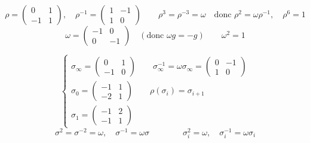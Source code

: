 \documentclass[11pt,a4paper]{article}
\begin{document}
\[
\boxed{\rho = \begin{pmatrix} 0 & 1 \\ -1 & 1 \end{pmatrix}}, \quad
\rho^{-1} = \begin{pmatrix} 1 & -1 \\ 1 & 0 \end{pmatrix}
\qquad \rho^3 = \rho^{-3} = \omega \quad \text{donc } \rho^2 = \omega\rho^{-1}, \quad \rho^6 = 1
\]
\[
\omega = \begin{pmatrix} -1 & 0 \\ 0 & -1 \end{pmatrix} \quad (\text{donc } \omega g = -g) \qquad \omega^2 = 1
\]

\[
\begin{cases}
\boxed{\sigma_\infty = \begin{pmatrix} 0 & 1 \\ -1 & 0 \end{pmatrix}} \qquad
\sigma_\infty^{-1} = \omega\sigma_\infty = \begin{pmatrix} 0 & -1 \\ 1 & 0 \end{pmatrix} \\[4pt]
\sigma_0 = \begin{pmatrix} -1 & 1 \\ -2 & 1 \end{pmatrix} \qquad \rho(\sigma_i) = \sigma_{i+1} \\[4pt]
\sigma_1 = \begin{pmatrix} -1 & 2 \\ -1 & 1 \end{pmatrix}
\end{cases}
\]
\[
\sigma^2 = \sigma^{-2} = \omega, \quad \sigma^{-1} = \omega\sigma \qquad\qquad \sigma_i^2 = \omega, \quad \sigma_i^{-1} = \omega\sigma_i
\]
\end{document}
